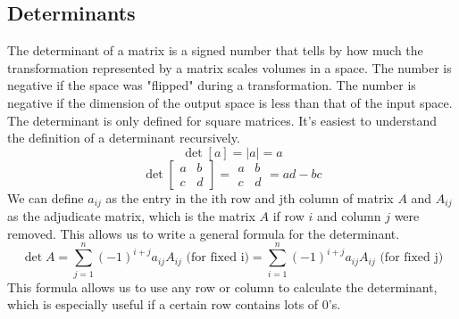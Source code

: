 \subsection{Determinants}
\noindent
The determinant of a matrix is a signed number that tells by how much the transformation represented by a matrix scales volumes in a space. The number is negative if the space was "flipped" during a transformation. The number is negative if the dimension of the output space is less than that of the input space.\\

\noindent
The determinant is only defined for square matrices. It's easiest to understand the definition of a determinant recursively.
\begin{equation*}
	\det{\left[ a \right]} = \lvert a \rvert = a
\end{equation*}
\begin{equation*}
	\det{\left[
		\begin{array}{cc}
			a & b \\
			c & d
		\end{array}
	\right]} = \begin{array}{|cc|}
		a & b \\
		c & d
	\end{array} = ad - bc
\end{equation*}
We can define $a_{ij}$ as the entry in the ith row and jth column of matrix $A$ and $A_{ij}$ as the adjudicate matrix, which is the matrix $A$ if row $i$ and column $j$ were removed. This allows us to write a general formula for the determinant.\\
\begin{equation*}
	\det{A} = \sum_{j=1}^{n}{\left(-1\right)^{i+j}a_{ij}A_{ij}} \text{ (for fixed i)} = 
	\sum_{i=1}^{n}{\left(-1\right)^{i+j}a_{ij}A_{ij}} \text{ (for fixed j)}
\end{equation*}
This formula allows us to use any row or column to calculate the determinant, which is especially useful if a certain row contains lots of 0's.\\

